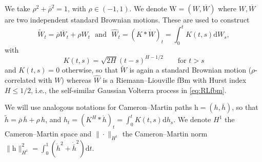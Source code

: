 \documentclass[11pt]{article}
\theoremstyle{plain}
\theoremstyle{definition}
\theoremstyle{remark}
\renewcommand{\bar}{\overline}
\renewcommand{\tilde}{\widetilde}
\renewcommand{\hat}{\widehat}
\newcommand{\dd}{\mathrm{d}}
\newcommand{\1}{\mathbf{1}}
\numberwithin{equation}{section}
\def\W{\mathrm W}
\def\h{\mathrm h}
\begin{document}
We take $\rho^2+\bar{\rho}^2=1$, with $\rho \in(-1,1)$. 
We denote  $\W = (W, \bar W)$ where $W, \bar W$ are two independent 
standard Brownian motions.
These are used to construct
\begin{equation}\label{eq:RLfbm}
\tilde W_t = \bar{\rho} \bar W_t+\rho W_t \ \ \ \text{and} \ \ \    \hat W_t = (K * \dot W)_t=\int_0^t K(t,s) \dd W_s,
\end{equation}
with 
\[
K(t,s)=\sqrt{2H}(t-s)^{H-1/2} 
\qquad \mbox{for } t > s 
\]
and $K(t,s) = 0$ otherwise, so that $\tilde W$ is again a standard Brownian motion ($\rho$-correlated with $W$) whereas $\hat W$ 
is a Riemann--Liouville fBm with Hurst index $H \le 1/2$, i.e., the self-similar Gaussian Volterra process in \eqref{eq:RLfbm}.

We will use analogous notations for Cameron--Martin paths
$ \h = (h, \bar h)$, so that $\tilde h = \bar{\rho} \, \bar h+\rho \, h$, and $\hat h_t = (K^H * \dot h)_t = \int_0^t K(t,s) \dd h_s$. We denote $H^1$ the Cameron--Martin space and  $\| \cdot \|_{H^1}$ the Cameron--Martin norm $\| \h \|_{H^1}^2 = \int_0^1 (\dot h^2 +  \dot{\bar{h}}^{2}) \dd t$.
\end{document}
